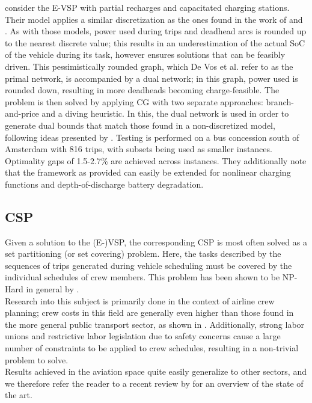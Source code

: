 \documentclass[]{article}
\begin{document}
 consider the E-VSP with partial recharges and capacitated charging stations. Their model applies a similar discretization as the ones found in the work of \citet{vanKootenNiekerk2017} and \citet{Zhang2021}. As with those models, power used during trips and deadhead arcs is rounded up to the nearest discrete value; this results in an underestimation of the actual SoC of the vehicle during its task, however ensures solutions that can be feasibly driven. This pessimistically rounded graph, which De Vos et al. refer to as the primal network, is accompanied by a dual network; in this graph, power used is rounded down, resulting in more deadheads becoming charge-feasible. The problem is then solved by applying CG with two separate approaches: branch-and-price and a diving heuristic. In this, the dual network is used in order to generate dual bounds that match those found in a non-discretized model, following ideas presented by \citet{Boland2017}. Testing is performed on a bus concession south of Amsterdam with 816 trips, with subsets being used as smaller instances. Optimality gaps of 1.5-2.7\% are achieved across instances. They additionally note that the framework as provided can easily be extended for nonlinear charging functions and depth-of-discharge battery degradation. 

\subsection{CSP}
Given a solution to the (E-)VSP, the corresponding CSP is most often solved as a set partitioning (or set covering) problem. Here, the tasks described by the sequences of trips generated during vehicle scheduling must be covered by the individual schedules of crew members. This problem has been shown to be NP-Hard in general by \citet{Fischetti1989}.\\
Research into this subject is primarily done in the context of airline crew planning; crew costs in this field are generally even higher than those found in the more general public transport sector, as shown in \citet{Barnhart2003}. Additionally, strong labor unions and restrictive labor legislation due to safety concerns cause a large number of constraints to be applied to crew schedules, resulting in a non-trivial problem to solve. \\
Results achieved in the aviation space quite easily generalize to other sectors, and we therefore refer the reader to a recent review by \citet{Deveci2018} for an overview of the state of the art. 
\end{document}
